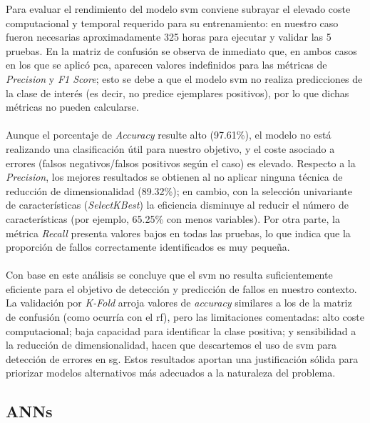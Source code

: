 Para evaluar el rendimiento del modelo \gls{svm} conviene subrayar el elevado coste computacional y temporal requerido para su entrenamiento: en nuestro caso fueron necesarias aproximadamente 325 horas para ejecutar y validar las 5 pruebas. En la matriz de confusión se observa de inmediato que, en ambos casos en los que se aplicó \gls{pca}, aparecen valores indefinidos para las métricas de \textit{Precision} y \textit{F1 Score}; esto se debe a que el modelo \gls{svm} no realiza predicciones de la clase de interés (es decir, no predice ejemplares positivos), por lo que dichas métricas no pueden calcularse.\\
\\
Aunque el porcentaje de \textit{Accuracy} resulte alto (97.61\%), el modelo no está realizando una clasificación útil para nuestro objetivo, y el coste asociado a errores (falsos negativos/falsos positivos según el caso) es elevado. Respecto a la \textit{Precision}, los mejores resultados se obtienen al no aplicar ninguna técnica de reducción de dimensionalidad (89.32\%); en cambio, con la selección univariante de características (\textit{SelectKBest}) la eficiencia disminuye al reducir el número de características (por ejemplo, 65.25\% con menos variables). Por otra parte, la métrica \textit{Recall} presenta valores bajos en todas las pruebas, lo que indica que la proporción de fallos correctamente identificados es muy pequeña.\\
\\
Con base en este análisis se concluye que el \gls{svm} no resulta suficientemente eficiente para el objetivo de detección y predicción de fallos en nuestro contexto. La validación por \textit{K-Fold} arroja valores de \textit{accuracy} similares a los de la matriz de confusión (como ocurría con el \gls{rf}), pero las limitaciones comentadas: alto coste computacional; baja capacidad para identificar la clase positiva; y sensibilidad a la reducción de dimensionalidad, hacen que descartemos el uso de \gls{svm} para detección de errores en \gls{sg}. Estos resultados aportan una justificación sólida para priorizar modelos alternativos más adecuados a la naturaleza del problema.


\subsection{ANNs} 


